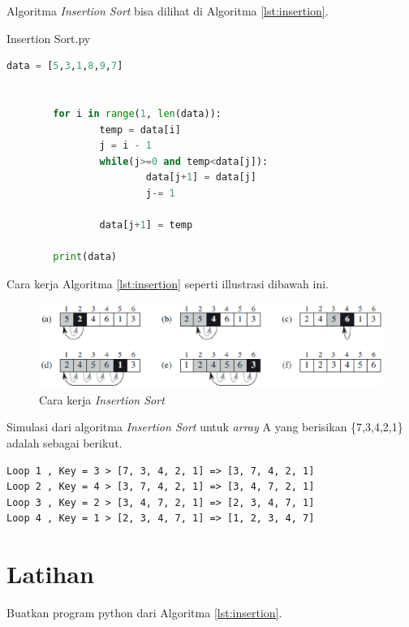 Algoritma \textit{Insertion Sort} bisa dilihat di Algoritma \ref{lst:insertion}. 
\begin{listprog}{Insertion Sort.py}
	\label{lst:insertion}
	\begin{lstlisting}[language=Python]
		data = [5,3,1,8,9,7]


		for i in range(1, len(data)):
				temp = data[i]
				j = i - 1
				while(j>=0 and temp<data[j]):
						data[j+1] = data[j]
						j-= 1

				data[j+1] = temp

		print(data)

	\end{lstlisting}
\end{listprog}

\FloatBarrier
Cara kerja Algoritma \ref{lst:insertion} seperti illustrasi dibawah ini.
\begin{figure}[htbp]%
\includegraphics[scale=0.8]{fig/InsertionSortMethod}%
\caption{Cara kerja \textit{Insertion Sort}}%
\label{fig:caraKerjaInsertion}%
\end{figure}
\FloatBarrier

Simulasi dari algoritma \textit{Insertion Sort} untuk \textit{array} A yang berisikan \{7,3,4,2,1\} adalah sebagai berikut.
\begin{verbatim}
Loop 1 , Key = 3 > [7, 3, 4, 2, 1] => [3, 7, 4, 2, 1]
Loop 2 , Key = 4 > [3, 7, 4, 2, 1] => [3, 4, 7, 2, 1]
Loop 3 , Key = 2 > [3, 4, 7, 2, 1] => [2, 3, 4, 7, 1]
Loop 4 , Key = 1 > [2, 3, 4, 7, 1] => [1, 2, 3, 4, 7]
\end{verbatim}



\pagebreak
\section{Latihan}
\begin{pemrograman}
Buatkan program python dari Algoritma \ref{lst:insertion}.
\end{pemrograman}

